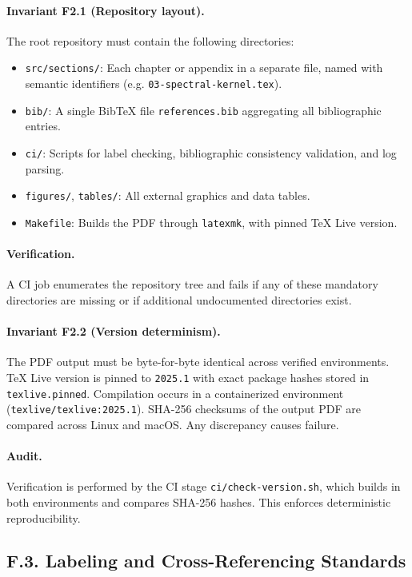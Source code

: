 \paragraph{Invariant F2.1 (Repository layout).} The root repository must contain the following directories:
\begin{itemize}
    \item \texttt{src/sections/}: Each chapter or appendix in a separate file, named with semantic identifiers (e.g. \texttt{03-spectral-kernel.tex}).
    \item \texttt{bib/}: A single BibTeX file \texttt{references.bib} aggregating all bibliographic entries.
    \item \texttt{ci/}: Scripts for label checking, bibliographic consistency validation, and log parsing.
    \item \texttt{figures/}, \texttt{tables/}: All external graphics and data tables.
    \item \texttt{Makefile}: Builds the PDF through \texttt{latexmk}, with pinned TeX Live version.
\end{itemize}

\paragraph{Verification.} A CI job enumerates the repository tree and fails if any of these mandatory directories are missing or if additional undocumented directories exist.

\paragraph{Invariant F2.2 (Version determinism).} The PDF output must be byte-for-byte identical across verified environments. TeX Live version is pinned to \texttt{2025.1} with exact package hashes stored in \texttt{texlive.pinned}. Compilation occurs in a containerized environment (\texttt{texlive/texlive:2025.1}). SHA-256 checksums of the output PDF are compared across Linux and macOS. Any discrepancy causes failure.

\paragraph{Audit.} Verification is performed by the CI stage \texttt{ci/check-version.sh}, which builds in both environments and compares SHA-256 hashes. This enforces deterministic reproducibility.

\subsection*{F.3. Labeling and Cross-Referencing Standards}

